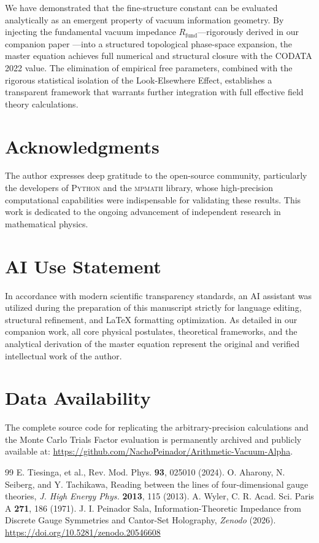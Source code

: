 \documentclass[12pt,a4paper]{article}
\begin{document}
We have demonstrated that the fine-structure constant can be evaluated analytically as an emergent property of vacuum information geometry. By injecting the fundamental vacuum impedance $R_{\text{fund}}$—rigorously derived in our companion paper \cite{peinador2026_foundational}—into a structured topological phase-space expansion, the master equation achieves full numerical and structural closure with the CODATA 2022 value. The elimination of empirical free parameters, combined with the rigorous statistical isolation of the Look-Elsewhere Effect, establishes a transparent framework that warrants further integration with full effective field theory calculations.

\section*{Acknowledgments}

The author expresses deep gratitude to the open-source community, particularly the developers of \textsc{Python} and the \textsc{mpmath} library, whose high-precision computational capabilities were indispensable for validating these results. This work is dedicated to the ongoing advancement of independent research in mathematical physics.

\section*{AI Use Statement}

In accordance with modern scientific transparency standards, an AI assistant was utilized during the preparation of this manuscript strictly for language editing, structural refinement, and LaTeX formatting optimization. As detailed in our companion work, all core physical postulates, theoretical frameworks, and the analytical derivation of the master equation represent the original and verified intellectual work of the author.

\section*{Data Availability}

The complete source code for replicating the arbitrary-precision calculations and the Monte Carlo Trials Factor evaluation is permanently archived and publicly available at: \url{https://github.com/NachoPeinador/Arithmetic-Vacuum-Alpha}.

\begin{thebibliography}{99}
 E. Tiesinga, et al., Rev. Mod. Phys. \textbf{93}, 025010 (2024).
 O. Aharony, N. Seiberg, and Y. Tachikawa, Reading between the lines of four-dimensional gauge theories, \textit{J. High Energy Phys.} \textbf{2013}, 115 (2013).
 A. Wyler, C. R. Acad. Sci. Paris A \textbf{271}, 186 (1971).
 J. I. Peinador Sala, Information-Theoretic Impedance from Discrete Gauge Symmetries and Cantor-Set Holography, \textit{Zenodo} (2026). \url{https://doi.org/10.5281/zenodo.20546608}
\end{thebibliography}
\end{document}
